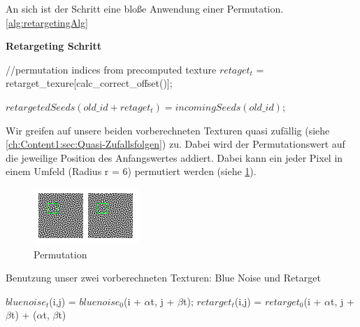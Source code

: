 An sich ist der Schritt eine bloße Anwendung einer Permutation.\ref{alg:retargetingAlg}

\begin{algorithm}[H]
    \caption{\textbf{Retargeting Schritt}}
    \begin{algorithmic}[1]
        \State //permutation indices from precomputed texture
        \State $retaget_{t}$ = retarget\_texure[calc\_correct\_offset()];
        
        \State $retargetedSeeds(old\_id + retaget_{t}) = incomingSeeds(old\_id);$
        
    \end{algorithmic}
    \label{alg:retargetingAlg}
\end{algorithm}

Wir greifen auf unsere beiden vorberechneten Texturen quasi zufällig (siehe \ref{ch:Content1:sec:Quasi-Zufallsfolgen})
zu. Dabei wird der Permutationswert auf die jeweilige Position des Anfangswertes addiert.
Dabei kann ein jeder Pixel in einem Umfeld (Radius r = 6) permutiert werden (siehe \ref{pic:Permutation}).

\begin{figure}[H]\label{pic:Permutation}
    \centering
    \includegraphics[width=0.5\linewidth]{content/simulatedAnnealing/Bilder/Permutation.png}
    \caption{Permutation}
\end{figure}

\begin{algorithm}[H]
    \caption{Benutzung unser zwei vorberechneten Texturen: Blue Noise und Retarget}
    \begin{algorithmic}[1]
        \State $bluenoise_{t}$(i,j) = $bluenoise_{0}$(i + $\alpha$t, j + $\beta$t); 
        \State $retarget_{t}$(i,j) = $retarget_{0}$(i + $\alpha$t, j + $\beta$t) + ($\alpha$t, $\beta$t)
    \end{algorithmic}
    \label{alg:Benutzung vorberechneter Texturen}
\end{algorithm}

\newpage


